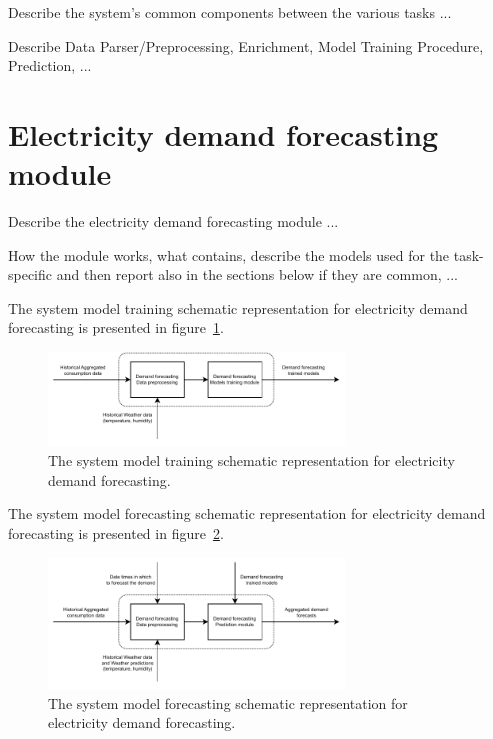Describe the system's common components between the various tasks ...

Describe Data Parser/Preprocessing, Enrichment, Model Training Procedure, Prediction, ...


\section{Electricity demand forecasting module}
\label{sec:demandmodel}
\vspace{0.2 cm}

Describe the electricity demand forecasting module ...

How the module works, what contains, describe the models used for the task-specific and then report also in the sections below if they are common, ...

The system model training schematic representation for electricity demand forecasting is presented in figure~\ref{fig:modeltrainingdemand}.


\begin{figure}[H]
\centering
\includegraphics[width=0.7\textwidth]{images/system_model_training_demand}
\caption{The system model training schematic representation for electricity demand forecasting.}
\label{fig:modeltrainingdemand}
\end{figure}

The system model forecasting schematic representation for electricity demand forecasting is presented in figure~\ref{fig:modelforecastingdemand}.

\begin{figure}[H]
\centering
\includegraphics[width=0.7\textwidth]{images/system_model_forecasting_demand}
\caption{The system model forecasting schematic representation for electricity demand forecasting.}
\label{fig:modelforecastingdemand}
\end{figure}


